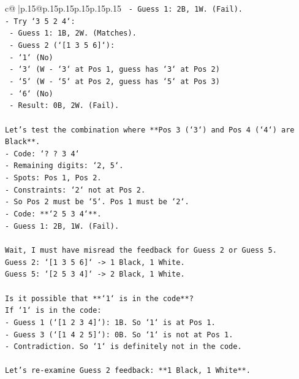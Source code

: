 \documentclass{article}
\begin{document}
{\begin{supertabular}{c@{$\;$}|p{.15\linewidth}@{}p{.15\linewidth}p{.15\linewidth}p{.15\linewidth}p{.15\linewidth}p{.15\linewidth}}
{{{\texttt{    {-}   Guess 1: 2B, 1W. (Fail).} \\
\texttt{{-}   Try `3 5 2 4`:} \\
\texttt{    {-}   Guess 1: 1B, 2W. (Matches).} \\
\texttt{    {-}   Guess 2 (`{[}1 3 5 6{]}`):} \\
\texttt{        {-}   `1` (No)} \\
\texttt{        {-}   `3` (W {-} `3` at Pos 1, guess has `3` at Pos 2)} \\
\texttt{        {-}   `5` (W {-} `5` at Pos 2, guess has `5` at Pos 3)} \\
\texttt{        {-}   `6` (No)} \\
\texttt{        {-}   Result: 0B, 2W. (Fail).} \\
\\ 
\texttt{Let's test the combination where **Pos 3 (`3`) and Pos 4 (`4`) are Black**.} \\
\texttt{{-}   Code: `? ? 3 4`} \\
\texttt{{-}   Remaining digits: `2, 5`.} \\
\texttt{{-}   Spots: Pos 1, Pos 2.} \\
\texttt{{-}   Constraints: `2` not at Pos 2.} \\
\texttt{{-}   So Pos 2 must be `5`. Pos 1 must be `2`.} \\
\texttt{{-}   Code: **`2 5 3 4`**.} \\
\texttt{{-}   Guess 1: 2B, 1W. (Fail).} \\
\\ 
\texttt{Wait, I must have misread the feedback for Guess 2 or Guess 5.} \\
\texttt{Guess 2: `{[}1 3 5 6{]}` {-}> 1 Black, 1 White.} \\
\texttt{Guess 5: `{[}2 5 3 4{]}` {-}> 2 Black, 1 White.} \\
\\ 
\texttt{Is it possible that **`1` is in the code**?} \\
\texttt{If `1` is in the code:} \\
\texttt{{-}   Guess 1 (`{[}1 2 3 4{]}`): 1B. So `1` is at Pos 1.} \\
\texttt{{-}   Guess 3 (`{[}1 4 2 5{]}`): 0B. So `1` is not at Pos 1.} \\
\texttt{{-}   Contradiction. So `1` is definitely not in the code.} \\
\\ 
\texttt{Let's re{-}examine Guess 2 feedback: **1 Black, 1 White**.} \\
}}}
\end{supertabular}}
\end{document}
